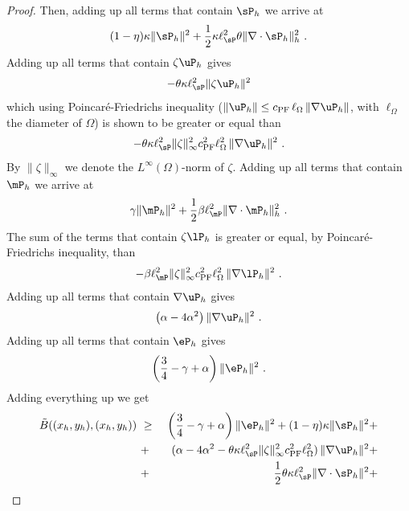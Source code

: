\begin{proof}
	Then, adding up all terms that contain $\sP_h$ we arrive at
	\begin{equation}
		(1-\eta) \kappa \|\sP_h\|^2 + \frac12 \kappa \ell_{\sP}^2 
		\theta  \|\nabla\cdot \sP_h\|_h^2~.
		\label{eq:term1}
	\end{equation}
	Adding up all terms that contain $\zeta \uP_h$ gives
	$$
	-\theta \kappa \ell_{\sP}^2 \|\zeta \uP_h\|^2
	$$
	which using Poincar\'e-Friedrichs inequality ($\|\uP_h\| \leq c_{\mbox{\scriptsize{PF}}}\,\ell_{\Omega}\,\|\nabla \uP_h\|$, 
	with $\ell_{\Omega}$ the diameter of $\Omega$) is shown to be greater or equal than 
	\begin{equation}
		- {\theta \kappa \ell_{\sP}^2 \|\zeta\|_{\infty}^2 c_{\mbox{\scriptsize{PF}}}^2 \ell_{\Omega}^2}\,\|\nabla \uP_h \|^2~.
		\label{eq:term2}
	\end{equation}
	By $\|\zeta\|_{\infty}$ we denote the $L^{\infty}(\Omega)$-norm of $\zeta$. Adding up all terms that contain $\mP_h$ we arrive at
	\begin{equation}
		\gamma \|\mP_h\|^2 +\frac12 \beta\ell_{\mP}^2  \|\nabla \cdot \mP_h \|_h^2~.
		\label{eq:term4}
	\end{equation}
	The sum of the terms that contain $\zeta \lP_h$ is greater or equal, by Poincaré-Friedrichs inequality, than
	\begin{equation}
		- \beta \ell_{\mP}^2 \|\zeta\|_{\infty}^2 c_{\mbox{\scriptsize{PF}}}^2 \ell_{\Omega}^2\,\|\nabla \lP_h \|^2~.
		\label{eq:term5}
	\end{equation}
	Adding up all terms that contain $\nabla \uP_h$ gives
	\begin{equation}
		\left ( \alpha - 4 \alpha^2 \right )
		\|\nabla \uP_h\|^2~.
		\label{eq:term6}
	\end{equation}
	Adding up all terms that contain $\eP_h$ gives
	\begin{equation}
		\left ( \frac34-\gamma + \alpha \right ) \|\eP_h\|^2~.
		\label{eq:term7}
	\end{equation}
	Adding everything up we get
	\begin{eqnarray}
		\tilde{B}((x_h,y_h),(x_h,y_h))~&\geq&~ \left (\frac34 -\gamma+\alpha \right ) \|\eP_h\|^2 + (1-\eta)\kappa \|\sP_h\|^2 + \nonumber \\
		~&+&~ (\alpha - 4 \alpha^2 - \theta \kappa \ell_{\sP}^2 \|\zeta\|_{\infty}^2 c_{\mbox{\scriptsize{PF}}}^2 \ell_{\Omega}^2)\, \|\nabla \uP_h\|^2 + \nonumber \\
		~&+&~\frac12 \theta \kappa \ell_{\sP}^2 \|\nabla \cdot \sP_h\|^2 + \nonumber \\

\end{eqnarray}
\end{proof}
